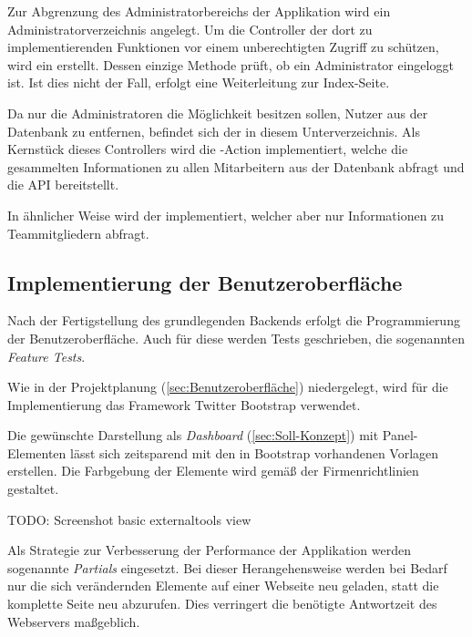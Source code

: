
Zur Abgrenzung des Administratorbereichs der Applikation wird ein Administratorverzeichnis angelegt.
Um die Controller der dort zu implementierenden Funktionen vor einem unberechtigten Zugriff zu schützen, wird ein
 erstellt. Dessen einzige Methode prüft, ob ein Administrator eingeloggt ist.
Ist dies nicht der Fall, erfolgt eine Weiterleitung zur Index-Seite.

Da nur die Administratoren die Möglichkeit besitzen sollen, Nutzer aus der Datenbank zu entfernen,
befindet sich der  in diesem Unterverzeichnis. Als Kernstück dieses
Controllers wird die -Action implementiert, welche die gesammelten Informationen
zu allen Mitarbeitern aus der Datenbank abfragt und die API bereitstellt.


In ähnlicher Weise wird der  implementiert, welcher aber nur
Informationen zu Teammitgliedern abfragt.

\subsection{Implementierung der Benutzeroberfläche}
\label{sec:Implementierung der Benutzeroberfläche}
Nach der Fertigstellung des grundlegenden Backends erfolgt die Programmierung der Benutzeroberfläche.
Auch für diese werden Tests geschrieben, die sogenannten \textit{Feature Tests}.


Wie in der Projektplanung (\Vgl \ref{sec:Benutzeroberfläche}) niedergelegt, wird für die Implementierung
das Framework Twitter Bootstrap verwendet.

Die gewünschte Darstellung als \textit{Dashboard} (\Vgl \ref{sec:Soll-Konzept}) mit Panel-Elementen
lässt sich zeitsparend mit den in Bootstrap vorhandenen Vorlagen erstellen. Die Farbgebung der Elemente wird gemäß der
Firmenrichtlinien gestaltet.

TODO: Screenshot basic externaltools view

Als Strategie zur Verbesserung der Performance der Applikation werden sogenannte
\textit{Partials} eingesetzt. Bei dieser Herangehensweise werden bei Bedarf nur die sich
verändernden Elemente auf einer Webseite neu geladen, statt die komplette Seite neu abzurufen.
Dies verringert die benötigte Antwortzeit des Webservers maßgeblich.

